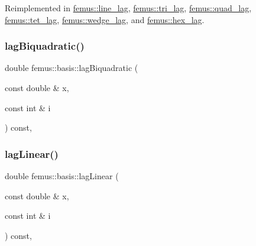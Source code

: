 Reimplemented in \mbox{\hyperlink{classfemus_1_1line__lag_aea0db4bd5a70c069b7cbf3f2f92a0c79}{femus\+::line\+\_\+lag}}, \mbox{\hyperlink{classfemus_1_1tri__lag_a93b897c5080dee5a7415a85735f96330}{femus\+::tri\+\_\+lag}}, \mbox{\hyperlink{classfemus_1_1quad__lag_a0e07e085178832564a1be9bf1ea95814}{femus\+::quad\+\_\+lag}}, \mbox{\hyperlink{classfemus_1_1tet__lag_a7abd03724f2fbcd92829a2c56fb1c49d}{femus\+::tet\+\_\+lag}}, \mbox{\hyperlink{classfemus_1_1wedge__lag_a3cd96af653ca43643e6fd8a7a53cda07}{femus\+::wedge\+\_\+lag}}, and \mbox{\hyperlink{classfemus_1_1hex__lag_a85a1a616557275dca6954a04eaaf5042}{femus\+::hex\+\_\+lag}}.

\mbox{\label{classfemus_1_1basis_a2571f53dfeae70eccf63033736098d07}} 
\subsubsection{\texorpdfstring{lag\+Biquadratic()}{lagBiquadratic()}}
{\footnotesize\ttfamily double femus\+::basis\+::lag\+Biquadratic (\begin{DoxyParamCaption}\item[{const double \&}]{x,  }\item[{const int \&}]{i }\end{DoxyParamCaption}) const\hspace{0.3cm}{\ttfamily [inline]}, {\ttfamily [protected]}}

\mbox{\label{classfemus_1_1basis_a614b2d4abe684a504bb0f561d46397fa}} 
\subsubsection{\texorpdfstring{lag\+Linear()}{lagLinear()}}
{\footnotesize\ttfamily double femus\+::basis\+::lag\+Linear (\begin{DoxyParamCaption}\item[{const double \&}]{x,  }\item[{const int \&}]{i }\end{DoxyParamCaption}) const\hspace{0.3cm}{\ttfamily [inline]}, {\ttfamily [protected]}}

